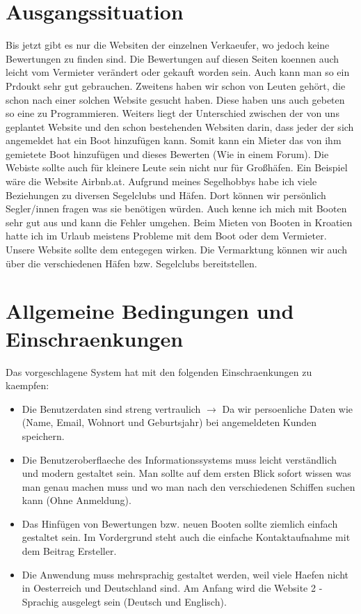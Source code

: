 \documentclass[12pt]{article}
\theoremstyle{definition}
\begin{document}
\pagebreak

\section{Ausgangssituation}
Bis jetzt gibt es nur die Websiten der einzelnen Verkaeufer, wo jedoch keine Bewertungen zu finden sind. Die Bewertungen auf diesen Seiten koennen auch leicht vom Vermieter verändert oder gekauft worden sein. Auch kann man so ein Prdoukt sehr gut gebrauchen. Zweitens haben wir schon von Leuten gehört, die schon nach einer solchen Website gesucht haben. Diese haben uns auch gebeten so eine zu Programmieren.
Weiters liegt der Unterschied zwischen der von uns geplantet Website und den schon bestehenden Websiten darin, dass jeder der sich angemeldet hat ein Boot hinzufügen kann. Somit kann ein Mieter das von ihm gemietete Boot hinzufügen und dieses Bewerten (Wie in einem Forum). Die Webiste sollte auch für kleinere Leute sein nicht nur für Großhäfen. Ein Beispiel wäre die Website Airbnb.at.
Aufgrund meines Segelhobbys habe ich viele Beziehungen zu diversen Segelclubs und Häfen. Dort können wir persönlich Segler/innen fragen was sie benötigen würden. Auch kenne ich mich mit Booten sehr gut aus und kann die Fehler umgehen. Beim Mieten von Booten in Kroatien hatte ich im Urlaub meistens Probleme mit dem Boot oder dem Vermieter. Unsere Website sollte dem entegegen wirken. 
Die Vermarktung können wir auch über die verschiedenen Häfen bzw. Segelclubs bereitstellen. 

\pagebreak

\section{Allgemeine Bedingungen und Einschraenkungen}

Das vorgeschlagene System hat mit den folgenden Einschraenkungen zu kaempfen:
\begin{itemize}
\item Die Benutzerdaten sind streng vertraulich $\rightarrow$ Da wir persoenliche Daten wie (Name, Email, Wohnort und Geburtsjahr) bei angemeldeten Kunden speichern.
\item Die Benutzeroberflaeche des Informationssystems muss leicht verständlich und modern gestaltet sein. Man sollte auf dem ersten Blick sofort wissen was man genau machen muss und wo man nach den verschiedenen Schiffen suchen kann (Ohne Anmeldung).
\item Das Hinfügen von Bewertungen bzw. neuen Booten sollte ziemlich einfach gestaltet sein. Im Vordergrund steht auch die einfache Kontaktaufnahme mit dem Beitrag Ersteller.
\item Die Anwendung muss mehrsprachig gestaltet werden, weil viele Haefen nicht in Oesterreich und Deutschland sind. Am Anfang wird die Website 2 - Sprachig ausgelegt sein (Deutsch und Englisch).
\end{itemize}
\end{document}
